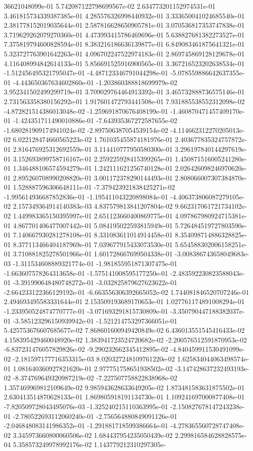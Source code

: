 36621048099e-01	5.742087122798699567e-02	2.634773201152974531e-01	3.461815734339387385e-01	4.285576326998440932e-01	3.333650041024685540e-01	2.381778152019035644e-01	2.587816628650905781e-01	3.070536817353747838e-01	3.719629262079270360e-01	4.473993415786469696e-01	5.638827681382273527e-01	7.375819794600828594e-01	8.383216186636139877e-01	6.849083461875641321e-01	5.323727763901642263e-01	4.096702247522974183e-01	2.869745869128129678e-01	4.116408994842614133e-01	5.856691525916900565e-01	3.367216523202638534e-01	-1.512456495321795047e-01	-4.487123346791044298e-01	-5.078559886642637355e-01	-4.443650367634602860e-01	-1.203860388818699979e-02	3.952341502499299719e-01	3.709029764464913392e-01	3.465732888736575146e-01	2.731563358380156292e-01	1.917601472793441508e-01	7.931885538552312098e-02	-4.872821514386013048e-02	-1.259691870676408199e-01	-1.460870471457409170e-01	-1.424351711490010886e-01	-7.643935367272587655e-02	-1.680281909174941024e-02	-2.897506387054539154e-02	-4.114662312270205013e-02	6.022128474660565223e-02	1.761035455874181976e-01	2.403677835324757872e-01	2.816476925312692559e-01	3.114410777950580300e-01	3.296197840144297619e-01	3.152693899758716167e-01	2.259225928415399265e-01	1.450871516005241280e-01	1.346488106574594279e-01	1.242111621256740128e-01	2.026426098246970620e-01	2.895260708990208820e-01	3.001172378290144493e-01	2.808066007307384870e-01	1.528887596306648111e-01	-7.379423921838425271e-02	-1.995614936687852836e-01	-1.195411043220898084e-01	-4.406373806087279105e-02	2.157349364914140383e-03	4.837579813841207804e-02	9.662317061721734102e-02	1.449983365150395997e-01	2.651123660400869775e-01	4.097867980924715381e-01	4.867701406477007442e-01	5.084195022593815949e-01	5.726484519727803590e-01	7.140667930281278108e-01	8.331083611014914458e-01	8.354098714886328825e-01	8.377113466404187969e-01	7.039677915433073530e-01	5.654588302006158251e-01	3.710881825278501966e-01	1.601728667699504338e-01	-3.008386743658049683e-03	-1.311534608889321774e-01	-1.981855951871307475e-01	-1.663607578264313658e-01	-1.575141008595177250e-01	-2.483592230823588043e-01	-3.391990648480748272e-01	-3.032825879627623622e-01	-2.664233122366129192e-01	-6.663556306392665052e-02	1.744081846520707246e-01	2.494693495583331644e-01	2.153509193689170653e-01	1.027761174891008294e-01	-1.233950524874770777e-01	-3.071693291815730809e-01	-3.350790447188382037e-01	-3.585123296150939942e-01	-1.521214753297366051e-01	5.425753676607685677e-02	7.868601600949420849e-02	6.436013551545416433e-02	4.158395429460048920e-02	1.383941723524720682e-02	-2.200576512591870953e-02	-6.837231476057829826e-02	-9.290232662345412895e-02	-4.840459911530491099e-02	-2.181597177716353315e-03	8.020327248109761220e-02	1.625834044063498574e-01	1.081640360927821620e-01	2.977751758651938502e-02	-3.147428637232493193e-02	-8.374769649320987219e-02	-7.227507758822838968e-02	1.357469969812109649e-02	9.985943628633649205e-02	1.873481583631875502e-01	2.630413514870628133e-01	1.869805918191134730e-01	1.109241697000877408e-01	-7.820509728043495076e-03	-1.325240215110363995e-01	-2.150827678147243238e-01	-2.780522693112060240e-01	-2.756564880849091126e-01	-2.046848083141986352e-01	-1.291881718599386664e-01	-4.278365560728747408e-02	3.345973660800060506e-02	1.684437954235050439e-02	2.299816584628828575e-04	5.358573249978992176e-02	1.143779212310297305e-